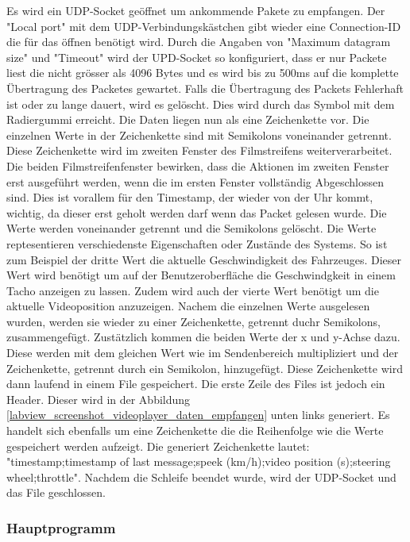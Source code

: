 Es wird ein UDP-Socket geöffnet um ankommende Pakete zu empfangen. Der "Local port" mit dem UDP-Verbindungskästchen gibt wieder eine Connection-ID die für das öffnen benötigt wird. Durch die Angaben von "Maximum datagram size" und "Timeout" wird der UPD-Socket so konfiguriert, dass er nur Packete liest die nicht grösser als 4096 Bytes und es wird bis zu 500ms auf die komplette Übertragung des Packetes gewartet. Falls die Übertragung des Packets Fehlerhaft ist oder zu lange dauert, wird es gelöscht. Dies wird durch das Symbol mit dem Radiergummi erreicht. Die Daten liegen nun als eine Zeichenkette vor. Die einzelnen Werte in der Zeichenkette sind mit Semikolons voneinander getrennt. Diese Zeichenkette wird im zweiten Fenster des Filmstreifens weiterverarbeitet. Die beiden Filmstreifenfenster bewirken, dass die Aktionen im zweiten Fenster erst ausgeführt werden, wenn die im ersten Fenster vollständig Abgeschlossen sind. Dies ist vorallem für den Timestamp, der wieder von der Uhr kommt, wichtig, da dieser erst geholt werden darf wenn das Packet gelesen wurde. Die Werte werden voneinander getrennt und die Semikolons gelöscht. Die Werte reptesentieren verschiedenste Eigenschaften oder Zustände des Systems. So ist zum Beispiel der dritte Wert die aktuelle Geschwindigkeit des Fahrzeuges. Dieser Wert wird benötigt um auf der Benutzeroberfläche die Geschwindgkeit in einem Tacho anzeigen zu lassen. Zudem wird auch der vierte Wert benötigt um die aktuelle Videoposition anzuzeigen. Nachem die einzelnen Werte ausgelesen wurden, werden sie wieder zu einer Zeichenkette, getrennt duchr Semikolons, zusammengefügt. Zustätzlich kommen die beiden Werte der x und y-Achse dazu. Diese werden mit dem gleichen Wert wie im Sendenbereich multipliziert und der Zeichenkette, getrennt durch ein Semikolon, hinzugefügt.  Diese Zeichenkette wird dann laufend in einem File gespeichert. Die erste Zeile des Files ist jedoch ein Header. Dieser wird in der Abbildung \ref{labview_screenshot_videoplayer_daten_empfangen} unten links generiert. Es handelt sich ebenfalls um eine Zeichenkette die die Reihenfolge wie die Werte gespeichert werden aufzeigt. Die generiert Zeichenkette lautet: "timestamp;timestamp of last message;speek (km/h);video position (s);steering wheel;throttle". Nachdem die Schleife beendet wurde, wird der UDP-Socket und das File geschlossen. 

\subsubsection{Hauptprogramm}
